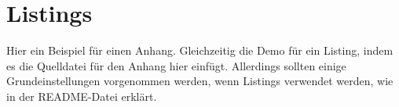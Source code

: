 \section{Listings}\label{appendix_dummy}
  Hier ein Beispiel für einen Anhang.
  Gleichzeitig die Demo für ein Listing, indem es die Quelldatei für den Anhang hier einfügt.
  Allerdings sollten einige Grundeinstellungen vorgenommen werden, wenn Listings verwendet werden, wie in der README-Datei erklärt.
  
